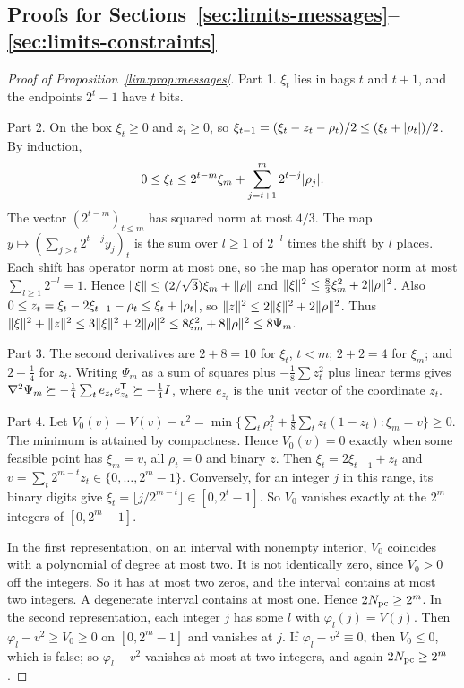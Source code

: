 \subsection{Proofs for Sections~\ref{sec:limits-messages}--\ref{sec:limits-constraints}}
\label{app:limits-proofs}

\begin{proof}[Proof of Proposition~\ref{lim:prop:messages}]
Part 1. $\xi_t$ lies in bags $t$ and $t+1$, and the endpoints $2^t-1$ have
$t$ bits.

Part 2. On the box $\xi_t\ge0$ and $z_t\ge0$, so
$\xi_{t-1}=(\xi_t-z_t-\rho_t)/2\le(\xi_t+\lvert \rho_t\rvert)/2$. By induction,
\[
0\le\xi_t\le2^{t-m}\xi_m+\sum_{j=t+1}^m2^{t-j}\lvert \rho_j\rvert .
\]
The vector $(2^{t-m})_{t\le m}$ has squared norm at most $4/3$. The map
$y\mapsto(\sum_{j>t}2^{t-j}y_j)_t$ is the sum over $l\ge1$ of $2^{-l}$ times
the shift by $l$ places. Each shift has operator norm at most one, so the map
has operator norm at most $\sum_{l\ge1}2^{-l}=1$. Hence
$\lVert \xi\rVert\le(2/\sqrt3)\xi_m+\lVert \rho\rVert$ and
$\lVert \xi\rVert^2\le\frac83\xi_m^2+2\lVert \rho\rVert^2$. Also
$0\le z_t=\xi_t-2\xi_{t-1}-\rho_t\le\xi_t+\lvert \rho_t\rvert$, so
$\lVert z\rVert^2\le2\lVert \xi\rVert^2+2\lVert \rho\rVert^2$. Thus
$\lVert \xi\rVert^2+\lVert z\rVert^2\le3\lVert \xi\rVert^2+2\lVert \rho\rVert^2\le8\xi_m^2+8\lVert \rho\rVert^2
\le8\Psi_m$.

Part 3. The second derivatives are $2+8=10$ for $\xi_t$, $t<m$; $2+2=4$ for
$\xi_m$; and $2-\frac14$ for $z_t$. Writing $\Psi_m$ as a sum of squares plus
$-\frac18\sum z_t^2$ plus linear terms gives
$\nabla^2\Psi_m\succeq-\frac14\sum_te_{z_t}e_{z_t}^{\mathsf T}\succeq-\frac14I$,
where $e_{z_t}$ is the unit vector of the coordinate $z_t$.

Part 4. Let $V_0(v)=V(v)-v^2
=\min\{\sum_t\rho_t^2+\frac18\sum_tz_t(1-z_t):\xi_m=v\}\ge0$. The minimum is
attained by compactness. Hence $V_0(v)=0$ exactly when some feasible point
has $\xi_m=v$, all $\rho_t=0$ and binary $z$. Then $\xi_t=2\xi_{t-1}+z_t$ and
$v=\sum_t2^{m-t}z_t\in\{0,\ldots,2^m-1\}$. Conversely, for an integer $j$ in
this range, its binary digits give $\xi_t=\lfloor j/2^{m-t}\rfloor\in
[0,2^t-1]$. So $V_0$ vanishes exactly at the $2^m$ integers of
$[0,2^m-1]$.

In the first representation, on an interval with nonempty interior,
$V_0$ coincides with a polynomial of degree at most two. It is not
identically zero, since $V_0>0$ off the integers. So it has at most two
zeros, and the interval contains at most two integers. A degenerate interval
contains at most one. Hence $2N_{\rm pc}\ge2^m$. In the second
representation, each integer $j$ has some $l$ with $\varphi_l(j)=V(j)$. Then
$\varphi_l-v^2\ge V_0\ge0$ on $[0,2^m-1]$ and vanishes at $j$. If
$\varphi_l-v^2\equiv0$, then $V_0\le0$, which is false; so $\varphi_l-v^2$
vanishes at most at two integers, and again $2N_{\rm pc}\ge2^m$.
\end{proof}

